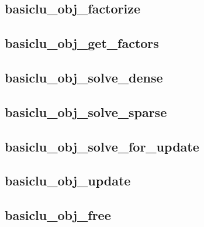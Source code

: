 \documentclass{article}
\begin{document}
\newpage
\subsection{basiclu\_obj\_factorize}
{\footnotesize

}

\newpage
\subsection{basiclu\_obj\_get\_factors}
{\footnotesize

}

\newpage
\subsection{basiclu\_obj\_solve\_dense}
{\footnotesize

}

\newpage
\subsection{basiclu\_obj\_solve\_sparse}
{\footnotesize

}

\newpage
\subsection{basiclu\_obj\_solve\_for\_update}
{\footnotesize

}

\newpage
\subsection{basiclu\_obj\_update}
{\footnotesize

}

\newpage
\subsection{basiclu\_obj\_free}
{\footnotesize

}
\newpage
 
\end{document}
